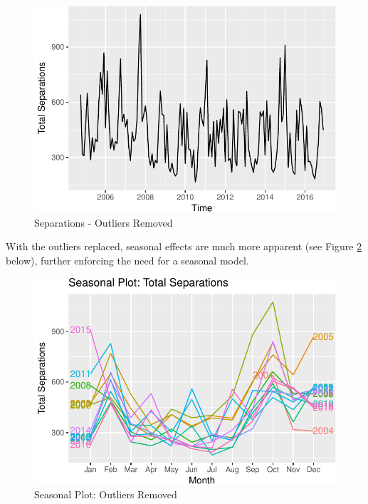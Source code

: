 \documentclass[12pt,letterpaper,toc=flat,oneside]{report}
\theoremstyle{definition}
\theoremstyle{definition}
\theoremstyle{definition}
\theoremstyle{remark}
\begin{document}
\begin{figure}[H]

{\centering \includegraphics{elliott-econometric-personnel-retention-18_files/figure-latex/response-plot-2-1} 

}

\caption{Separations - Outliers Removed}\label{fig:response-plot-2}
\end{figure}

With the outliers replaced, seasonal effects are much more apparent (see
Figure \ref{fig:response-season-plot-2} below), further enforcing the
need for a seasonal model.

\begin{figure}[H]

{\centering \includegraphics{elliott-econometric-personnel-retention-18_files/figure-latex/response-season-plot-2-1} 

}

\caption{Seasonal Plot: Outliers Removed}\label{fig:response-season-plot-2}
\end{figure}
\end{document}
